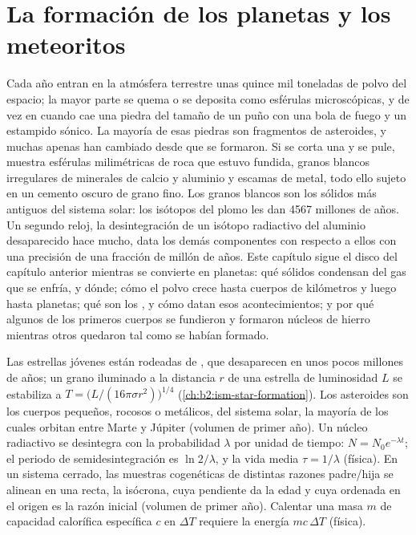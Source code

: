 \chapter{La formación de los planetas y los meteoritos}\label{ch:b2:planet-formation-meteorites}

Cada año entran en la atmósfera terrestre unas quince mil toneladas de polvo
del espacio; la mayor parte se quema o se deposita como esférulas microscópicas, y de vez
en cuando cae una piedra del tamaño de un puño con una bola de fuego y un estampido sónico.
La mayoría de esas piedras son fragmentos de asteroides, y muchas apenas han cambiado
desde que se formaron. Si se corta una y se pule, muestra esférulas milimétricas
de roca que estuvo fundida, granos blancos irregulares de minerales de calcio y
aluminio y escamas de metal, todo ello sujeto en un cemento oscuro de grano fino. Los granos
blancos son los sólidos más antiguos del sistema solar: los isótopos del plomo les dan
4567 millones de años. Un segundo reloj, la desintegración de un isótopo radiactivo del
aluminio desaparecido hace mucho, data los demás componentes con respecto a
ellos con una precisión de una fracción de millón de años. Este capítulo sigue el disco del
capítulo anterior mientras se convierte en planetas: qué sólidos condensan del gas que
se enfría, y dónde; cómo el polvo crece hasta cuerpos de kilómetros y luego
hasta planetas; qué son los , y cómo datan esos acontecimientos; y por qué
algunos de los primeros cuerpos se fundieron y formaron núcleos de hierro mientras otros quedaron tal como se
habían formado.

\begin{recall}
Las estrellas jóvenes están rodeadas de , que desaparecen en unos
pocos millones de años; un grano iluminado a la distancia $r$ de una estrella de
luminosidad $L$ se estabiliza a $T = \bigl(L/(16\pi\sigma r^2)\bigr)^{1/4}$
(\cref{ch:b2:ism-star-formation}). Los asteroides son los cuerpos pequeños, rocosos o metálicos,
del sistema solar, la mayoría de los cuales orbitan entre Marte y Júpiter (volumen de primer
año). Un núcleo radiactivo se desintegra con la probabilidad $\lambda$ por unidad de
tiempo: $N = N_0 e^{-\lambda t}$; el periodo de semidesintegración es $\ln 2/\lambda$, y la vida
media $\tau = 1/\lambda$ (física). En un sistema cerrado, las muestras cogenéticas de
distintas razones padre/hija se alinean en una recta, la isócrona, cuya
pendiente da la edad y cuya ordenada en el origen es la razón inicial (volumen de primer año).
Calentar una masa $m$ de capacidad calorífica específica $c$ en $\Delta T$ requiere la energía
$mc\,\Delta T$ (física).
\end{recall}

